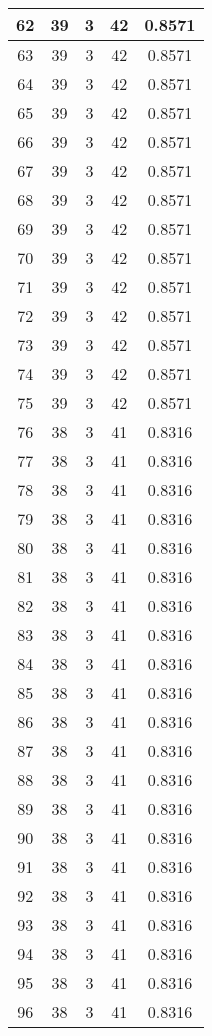 \documentclass[letterpaper, 12pt]{article}
\begin{document}
\begin{longtable}{|c|c|c|c|c|}
\hline
62 & 39 & 3 & 42 & 0.8571 \\
\hline
63 & 39 & 3 & 42 & 0.8571 \\
\hline
64 & 39 & 3 & 42 & 0.8571 \\
\hline
65 & 39 & 3 & 42 & 0.8571 \\
\hline
66 & 39 & 3 & 42 & 0.8571 \\
\hline
67 & 39 & 3 & 42 & 0.8571 \\
\hline
68 & 39 & 3 & 42 & 0.8571 \\
\hline
69 & 39 & 3 & 42 & 0.8571 \\
\hline
70 & 39 & 3 & 42 & 0.8571 \\
\hline
71 & 39 & 3 & 42 & 0.8571 \\
\hline
72 & 39 & 3 & 42 & 0.8571 \\
\hline
73 & 39 & 3 & 42 & 0.8571 \\
\hline
74 & 39 & 3 & 42 & 0.8571 \\
\hline
75 & 39 & 3 & 42 & 0.8571 \\
\hline
76 & 38 & 3 & 41 & 0.8316 \\
\hline
77 & 38 & 3 & 41 & 0.8316 \\
\hline
78 & 38 & 3 & 41 & 0.8316 \\
\hline
79 & 38 & 3 & 41 & 0.8316 \\
\hline
80 & 38 & 3 & 41 & 0.8316 \\
\hline
81 & 38 & 3 & 41 & 0.8316 \\
\hline
82 & 38 & 3 & 41 & 0.8316 \\
\hline
83 & 38 & 3 & 41 & 0.8316 \\
\hline
84 & 38 & 3 & 41 & 0.8316 \\
\hline
85 & 38 & 3 & 41 & 0.8316 \\
\hline
86 & 38 & 3 & 41 & 0.8316 \\
\hline
87 & 38 & 3 & 41 & 0.8316 \\
\hline
88 & 38 & 3 & 41 & 0.8316 \\
\hline
89 & 38 & 3 & 41 & 0.8316 \\
\hline
90 & 38 & 3 & 41 & 0.8316 \\
\hline
91 & 38 & 3 & 41 & 0.8316 \\
\hline
92 & 38 & 3 & 41 & 0.8316 \\
\hline
93 & 38 & 3 & 41 & 0.8316 \\
\hline
94 & 38 & 3 & 41 & 0.8316 \\
\hline
95 & 38 & 3 & 41 & 0.8316 \\
\hline
96 & 38 & 3 & 41 & 0.8316 \\

\end{longtable}
\end{document}

